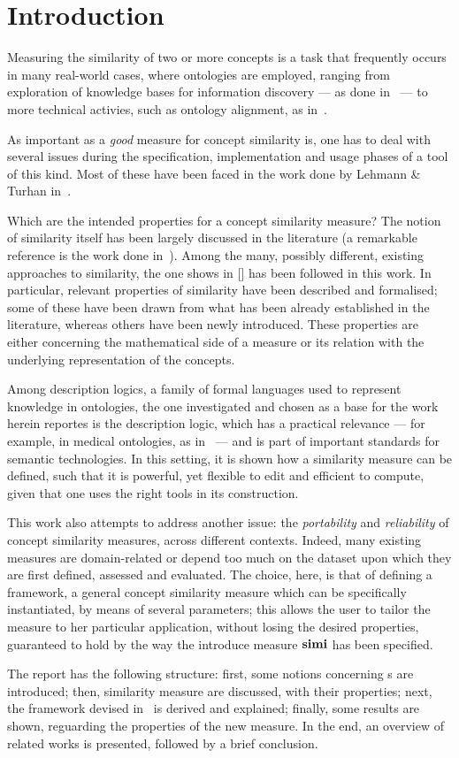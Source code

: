 \section{Introduction}

Measuring the similarity of two or more concepts is a task that frequently occurs in many real-world cases, where ontologies are employed, ranging from exploration of knowledge bases for information discovery --- as done in~\cite{GF13} --- to more technical activies, such as ontology alignment, as in~\cite{CHu11}.

As important as a \emph{good} measure for concept similarity is, one has to deal with several issues during the specification, implementation and usage phases of a tool of this kind.
Most of these have been faced in the work done by Lehmann \& Turhan in~\cite{LeTu12}.

Which are the intended properties for a concept similarity measure?
The notion of similarity itself has been largely discussed in the literature (a remarkable reference is the work done in~\cite{Tve77}).
Among the many, possibly different, existing approaches to similarity, the one shows in [] has been followed in this work.
In particular, relevant properties of similarity have been described and formalised; some of these have been drawn from what has been already established in the literature, whereas others have been newly introduced.
These properties are either concerning the mathematical side of a measure or its relation with the underlying representation of the concepts.

Among description logics, a family of formal languages used to represent knowledge in ontologies, the one investigated and chosen as a base for the work herein reportes is the \elh description logic, which has a practical relevance --- for example, in medical ontologies, as in~\cite{GF13} --- and is part of important standards for semantic technologies.
In this setting, it is shown how a similarity measure can be defined, such that it is powerful, yet flexible to edit and efficient to compute, given that one uses the right tools in its construction.

This work also attempts to address another issue: the \emph{portability} and \emph{reliability} of concept similarity measures, across different contexts.
Indeed, many existing measures are domain-related or depend too much on the dataset upon which they are first defined, assessed and evaluated.
The choice, here, is that of defining a framework, a general concept similarity measure which can be specifically instantiated, by means of several parameters; this allows the user to tailor the measure to her particular application, without losing the desired properties, guaranteed to hold by the way the introduce measure \(\operatorname{\mathbf{simi}}\) has been specified.

The report has the following structure:
first, some notions concerning \dl{}s are introduced;
then, similarity measure are discussed, with their properties;
next, the framework devised in~\cite{LeTu12} is derived and explained;
finally, some results are shown, reguarding the properties of the new measure.
In the end, an overview of related works is presented, followed by a brief conclusion.
